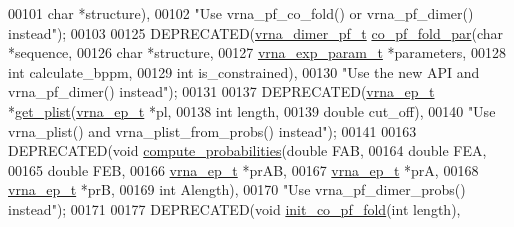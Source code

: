 \begin{DoxyCode}
00101                                       \textcolor{keywordtype}{char}  *structure),
00102 \textcolor{stringliteral}{"Use vrna\_pf\_co\_fold() or vrna\_pf\_dimer() instead"});
00103 
00125 DEPRECATED(\hyperlink{group__part__func__global_structvrna__dimer__pf__s}{vrna\_dimer\_pf\_t} \hyperlink{group__part__func__global__deprecated_gaabfc6cb6d02b8f08ac4c92f4f5b125d9}{co\_pf\_fold\_par}(\textcolor{keywordtype}{char}              *sequence,
00126                                           \textcolor{keywordtype}{char}              *structure,
00127                                           \hyperlink{group__energy__parameters_structvrna__exp__param__s}{vrna\_exp\_param\_t}  *parameters,
00128                                           \textcolor{keywordtype}{int}               calculate\_bppm,
00129                                           \textcolor{keywordtype}{int}               is\_constrained),
00130 \textcolor{stringliteral}{"Use the new API and vrna\_pf\_dimer() instead"});
00131 
00137 DEPRECATED(\hyperlink{group__struct__utils__plist_structvrna__elem__prob__s}{vrna\_ep\_t} *\hyperlink{part__func__co_8h_afb35675f133966dc9f8a8c2c9686e13a}{get\_plist}(\hyperlink{group__struct__utils__plist_structvrna__elem__prob__s}{vrna\_ep\_t} *pl,
00138                                 \textcolor{keywordtype}{int}       length,
00139                                 \textcolor{keywordtype}{double}    cut\_off),
00140 \textcolor{stringliteral}{"Use vrna\_plist() and vrna\_plist\_from\_probs() instead"});
00141 
00163 DEPRECATED(\textcolor{keywordtype}{void} \hyperlink{group__part__func__global__deprecated_ga94c19120130e66a667a10a3c8598550c}{compute\_probabilities}(\textcolor{keywordtype}{double}    FAB,
00164                                       \textcolor{keywordtype}{double}    FEA,
00165                                       \textcolor{keywordtype}{double}    FEB,
00166                                       \hyperlink{group__struct__utils__plist_structvrna__elem__prob__s}{vrna\_ep\_t} *prAB,
00167                                       \hyperlink{group__struct__utils__plist_structvrna__elem__prob__s}{vrna\_ep\_t} *prA,
00168                                       \hyperlink{group__struct__utils__plist_structvrna__elem__prob__s}{vrna\_ep\_t} *prB,
00169                                       \textcolor{keywordtype}{int}       Alength),
00170 \textcolor{stringliteral}{"Use vrna\_pf\_dimer\_probs() instead"});
00171 
00177 DEPRECATED(\textcolor{keywordtype}{void}   \hyperlink{group__part__func__global__deprecated_gaa12dda9dd6179cdd22bcce87c0682c07}{init\_co\_pf\_fold}(\textcolor{keywordtype}{int} length),

\end{DoxyCode}
